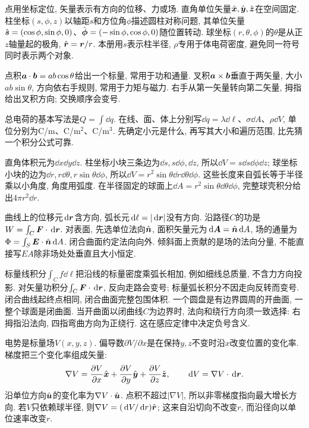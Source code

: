 \label{ch:math}
点用坐标定位, 矢量表示有方向的位移、力或场. 直角单位矢量$\hat{\boldsymbol{x}},\hat{\boldsymbol{y}},\hat{\boldsymbol{z}}$在空间固定. 柱坐标$(s,\phi,z)$以轴距$s$和方位角$\phi$描述圆柱对称问题, 其单位矢量$\hat{\boldsymbol{s}}=(\cos\phi,\sin\phi,0)$、$\hat{\boldsymbol{\phi}}=(-\sin\phi,\cos\phi,0)$随位置转动. 球坐标$(r,\theta,\phi)$的$\theta$是从正$z$轴量起的极角, $\hat{\boldsymbol{r}}=\boldsymbol{r}/r$. 本册用$s$表示柱半径, $\rho$专用于体电荷密度, 避免同一符号同时表示两个对象.

点积$\boldsymbol{a}\cdot\boldsymbol{b}=ab\cos\theta$给出一个标量, 常用于功和通量. 叉积$\boldsymbol{a}\times\boldsymbol{b}$垂直于两矢量, 大小$ab\sin\theta$, 方向依右手规则, 常用于力矩与磁力. 右手从第一矢量转向第二矢量, 拇指给出叉积方向; 交换顺序会变号.

总电荷的基本写法是$Q=\int\dd q$. 在线、面、体上分别写$\dd q=\lambda\dd\ell$、$\sigma\dd A$、$\rho\dd V$, 单位分别为C/m、C/m$^2$、C/m$^3$. 先确定小元是什么, 再写其大小和遍历范围, 比先猜一个积分公式可靠.

直角体积元为$\dd x\dd y\dd z$. 柱坐标小块三条边为$\dd s,s\dd\phi,\dd z$, 所以$\dd V=s\dd s\dd\phi\dd z$; 球坐标小块的边为$\dd r,r\dd\theta,r\sin\theta\dd\phi$, 所以$\dd V=r^2\sin\theta\dd r\dd\theta\dd\phi$. 这些长度来自弧长等于半径乘以小角度, 角度用弧度. 在半径固定的球面上$\dd A=r^2\sin\theta\dd\theta\dd\phi$, 完整球壳积分给出$4\pi r^2\dd r$.

曲线上的位移元$\,\mathrm d\boldsymbol{r}$含方向, 弧长元$\,\mathrm d\ell=|\,\mathrm d\boldsymbol{r}|$没有方向. 沿路径$C$的功是$W=\int_C\boldsymbol{F}\cdot\,\mathrm d\boldsymbol{r}$. 对表面, 先选单位法向$\hat{\boldsymbol{n}}$, 面积矢量元为$\,\mathrm d\boldsymbol{A}=\hat{\boldsymbol{n}}\,\mathrm d A$, 场的通量为$\Phi=\int_S\boldsymbol{E}\cdot\hat{\boldsymbol{n}}\,\mathrm d A$. 闭合曲面约定法向向外. 倾斜面上贡献的是场的法向分量, 不能直接写$EA$除非场处处垂直且大小恒定.

标量线积分$\int_C f\dd\ell$把沿线的标量密度乘弧长相加, 例如细线总质量, 不含力方向投影. 对矢量功积分$\int_C\boldsymbol{F}\cdot\,\mathrm d\boldsymbol{r}$, 反向走路会变号; 标量弧长积分不因走向反转而变号. 闭合曲线起终点相同, 闭合曲面完整包围体积. 一个圆盘是有边界圆周的开曲面, 一整个球面是闭曲面. 当开曲面以闭曲线$C$为边界时, 法向和绕行方向须一致选择: 右拇指沿法向, 四指弯曲方向为正绕行. 这在感应定律中决定负号含义.

电势是标量场$V(x,y,z)$. 偏导数$\partial V/\partial x$是在保持$y,z$不变时沿$x$改变位置的变化率. 梯度把三个变化率组成矢量:
\[
\nabla V=\frac{\partial V}{\partial x}\hat{\boldsymbol{x}}+\frac{\partial V}{\partial y}\hat{\boldsymbol{y}}+\frac{\partial V}{\partial z}\hat{\boldsymbol{z}},
\qquad \,\mathrm d V=\nabla V\cdot\,\mathrm d\boldsymbol{r}.
\]
沿单位方向$\hat{\boldsymbol{u}}$的变化率为$\nabla V\cdot\hat{\boldsymbol{u}}$. 点积不超过$|\nabla V|$, 所以非零梯度指向最大增长方向. 若$V$只依赖球半径, 则$\nabla V=(\,\mathrm d V/\,\mathrm d r)\hat{\boldsymbol{r}}$; 这来自沿切向不改变$r$, 而沿径向以单位速率改变$r$.


